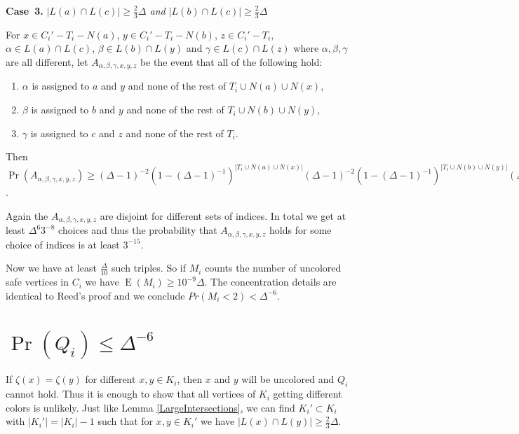 \documentclass[12pt]{article}
\theoremstyle{plain}
\theoremstyle{definition}
\theoremstyle{remark}
\newcommand{\card}[1]{\left|#1\right|}
\newcommand{\ex}{\operatorname{E}}
\begin{document}
\textbf{Case~3.} \textit{$\card{L(a) \cap L(c)} \geq \frac23 \Delta$ and $\card{L(b)
\cap L(c)} \geq \frac23 \Delta$}

For $x \in C_i' - T_i - N(a)$, $y \in C_i' - T_i - N(b)$, $z \in C_i' - T_i$,
$\alpha \in L(a) \cap L(c)$, $\beta \in L(b) \cap L(y)$ and $\gamma \in L(c)
\cap L(z)$ where $\alpha, \beta, \gamma$ are all different, let $A_{\alpha,
\beta, \gamma, x, y, z}$ be the event that all of the following hold:

\begin{enumerate}
  \item $\alpha$ is assigned to $a$ and $y$ and none of the rest of $T_i \cup
  N(a) \cup N(x)$,
  \item $\beta$ is assigned to $b$ and $y$ and none of the rest of $T_i \cup
  N(b) \cup N(y)$,
  \item $\gamma$ is assigned to $c$ and $z$ and none of the rest of $T_i$.
\end{enumerate}

Then $\Pr(A_{\alpha, \beta, \gamma, x, y, z}) \geq (\Delta-1)^{-2}(1-
(\Delta-1)^{-1})^{\card{T_i \cup N(a) \cup N(x)}}(\Delta-1)^{-2}(1-
(\Delta-1)^{-1})^{\card{T_i \cup N(b) \cup N(y)}}(\Delta-1)^{-2}(1-
(\Delta-1)^{-1})^{\card{T_i}} \geq (\Delta-1)^{-6}3^{-7}$.

Again the $A_{\alpha, \beta, \gamma, x, y, z}$ are disjoint for different sets
of indices. In total we get at least $\Delta^6 3^{-8}$
choices and thus the probability that $A_{\alpha, \beta, \gamma, x, y, z}$ holds
for some choice of indices is at least $3^{-15}$.

\bigskip

Now we have at least $\frac{\Delta}{10}$ such triples.  So if $M_i$ counts the
number of uncolored safe vertices in $C_i$ we have $\ex(M_i) \geq
10^{-9}\Delta$.  The concentration details are identical to Reed's proof and we
conclude $Pr(M_i < 2) < \Delta^{-6}$.

\section{$\Pr(Q_i) \leq \Delta^{-6}$}
If $\zeta(x) = \zeta(y)$ for different $x,y \in K_i$, then $x$ and $y$ will be
uncolored and $Q_i$ cannot hold.  Thus it is enough to show that all vertices of
$K_i$ getting different colors is unlikely.  Just like Lemma
\ref{LargeIntersections}, we can find $K_i' \subset K_i$ with $\card{K_i'} =
\card{K_i} - 1$ such that for $x,y \in K_i'$ we have $\card{L(x) \cap L(y)}
\geq \frac23 \Delta$.  
\end{document}
